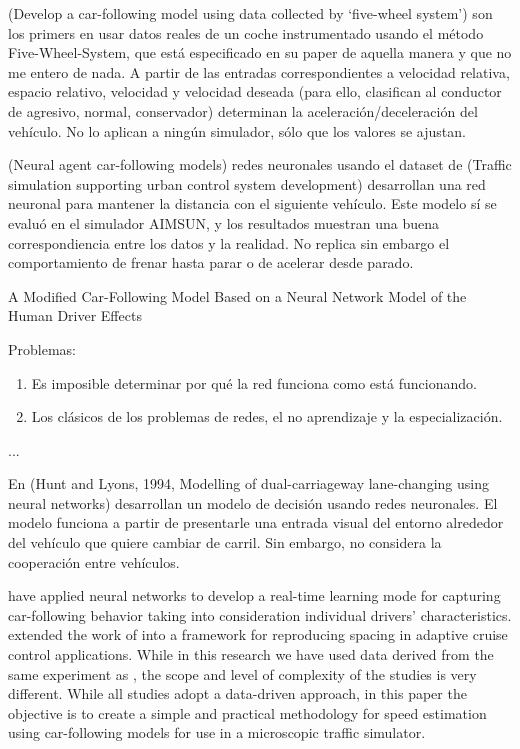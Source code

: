 (Develop a car-following model using data collected by ‘five-wheel
system’) son los primers en usar datos reales de un coche instrumentado usando el método Five-Wheel-System, que está especificado en su paper de aquella manera y que no me entero de nada. A partir de las entradas correspondientes a velocidad relativa, espacio relativo, velocidad y velocidad deseada (para ello, clasifican al conductor de agresivo, normal, conservador) determinan la aceleración/deceleración del vehículo. No lo aplican a ningún simulador, sólo que los valores se ajustan.

(Neural agent car-following models) redes neuronales usando el dataset de (Traffic simulation supporting urban control system development) desarrollan una red neuronal para mantener la distancia con el siguiente vehículo. Este modelo sí se evaluó en el simulador AIMSUN, y los resultados muestran una buena correspondiencia entre los datos y la realidad. No replica sin embargo el comportamiento de frenar hasta parar o de acelerar desde parado.

A Modified Car-Following Model Based on a Neural Network Model of the Human Driver Effects


Problemas:

\begin{enumerate}
	\item Es imposible determinar por qué la red funciona como está funcionando.
	\item Los clásicos de los problemas de redes, el no aprendizaje y la especialización.
\end{enumerate}

...

En (Hunt and Lyons, 1994, Modelling of dual-carriageway lane-changing using neural networks) desarrollan un modelo de decisión usando redes neuronales. El modelo funciona a partir de presentarle una entrada visual del entorno alrededor del vehículo que quiere cambiar de carril. Sin embargo, no considera la cooperación entre vehículos.

\cite{Simonelli2009} have applied neural networks to develop a real-time learning mode for capturing car-following behavior taking into consideration individual drivers’ characteristics. \cite{Bifulco2014} extended the work of \cite{Simonelli2009} into a framework for reproducing spacing in adaptive cruise control applications. While in this research we have used data derived from the same experiment as \cite{Simonelli2009}, the scope and level of complexity of the studies is very different. While all studies adopt a data-driven approach, in this paper the objective is to create a simple and practical methodology for speed estimation using car-following models for use in a microscopic traffic simulator.

